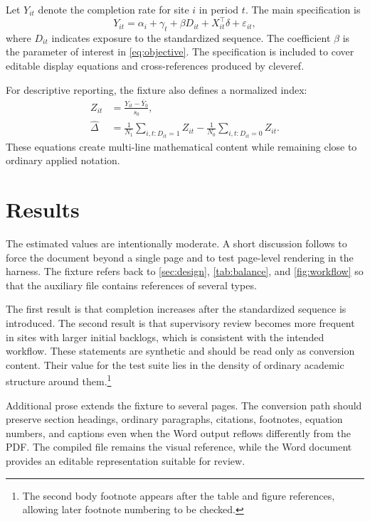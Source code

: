 \documentclass[11pt]{article}
\begin{document}
Let $Y_{it}$ denote the completion rate for site $i$ in period $t$. The main
specification is
\begin{equation}
Y_{it}=\alpha_i+\gamma_t+\beta D_{it}+X_{it}^{\top}\delta+\varepsilon_{it},
\label{eq:objective}
\end{equation}
where $D_{it}$ indicates exposure to the standardized sequence. The coefficient
$\beta$ is the parameter of interest in \cref{eq:objective}. The specification is
included to cover editable display equations and cross-references produced by
cleveref.

For descriptive reporting, the fixture also defines a normalized index:
\begin{align}
Z_{it}
  &= \frac{Y_{it}-\bar{Y}_{0}}{s_{0}},\\
\widehat{\Delta}
  &= \frac{1}{N_1}\sum_{i,t:D_{it}=1} Z_{it}
     - \frac{1}{N_0}\sum_{i,t:D_{it}=0} Z_{it}.
\end{align}
These equations create multi-line mathematical content while remaining close to
ordinary applied notation.

\section{Results}
\label{sec:results}

The estimated values are intentionally moderate. A short discussion follows to
force the document beyond a single page and to test page-level rendering in the
harness. The fixture refers back to \cref{sec:design}, \cref{tab:balance}, and
\cref{fig:workflow} so that the auxiliary file contains references of several
types.

The first result is that completion increases after the standardized sequence is
introduced. The second result is that supervisory review becomes more frequent in
sites with larger initial backlogs, which is consistent with the intended
workflow. These statements are synthetic and should be read only as conversion
content. Their value for the test suite lies in the density of ordinary academic
structure around them.\footnote{The second body footnote appears after the table
and figure references, allowing later footnote numbering to be checked.}

Additional prose extends the fixture to several pages. The conversion path should
preserve section headings, ordinary paragraphs, citations, footnotes, equation
numbers, and captions even when the Word output reflows differently from the PDF.
The compiled file remains the visual reference, while the Word document provides
an editable representation suitable for review.
\end{document}
